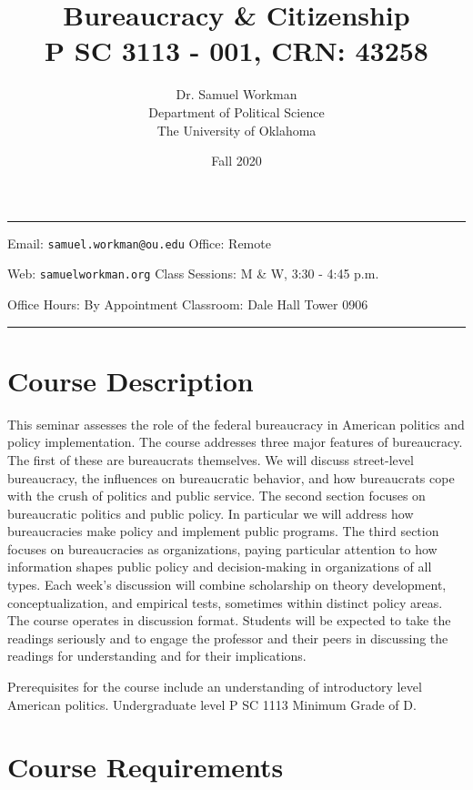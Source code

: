 \documentclass[a4paper,12pt]{article}
\title{Bureaucracy \& Citizenship \\ \large{\small P SC 3113 - 001, CRN: 43258}}
\author{Dr. Samuel Workman \\ Department of Political Science \\ The University of Oklahoma}
\date{Fall 2020}
\begin{document}
\maketitle

\begin{center}\rule{6.5in}{2pt}\end{center}

\noindent Email: \texttt{samuel.workman@ou.edu} \hfill Office: Remote

\noindent Web: \texttt{samuelworkman.org} \hfill Class Sessions: M \& W, 3:30 - 4:45 p.m.

\noindent Office Hours: By Appointment \hfill Classroom: Dale Hall Tower 0906

\begin{center}\rule{4in}{2pt}\end{center}

\section*{Course Description}

This seminar assesses the role of the federal bureaucracy in American politics and policy implementation. The course addresses three major features of bureaucracy. The first of these are bureaucrats themselves. We will discuss street-level bureaucracy, the influences on bureaucratic behavior, and how bureaucrats cope with the crush of politics and public service. The second section focuses on bureaucratic politics and public policy. In particular we will address how bureaucracies make policy and implement public programs. The third section focuses on bureaucracies as organizations, paying particular attention to how information shapes public policy and decision-making in organizations of all types. Each week’s discussion will combine scholarship on theory development, conceptualization, and empirical tests, sometimes within distinct policy areas. The course operates in discussion format. Students will be expected to take the readings seriously and to engage the professor and their peers in discussing the readings for understanding and for their implications.

Prerequisites for the course include an understanding of introductory level American politics. Undergraduate level P SC 1113 Minimum Grade of D.

\section*{Course Requirements}
\end{document}

